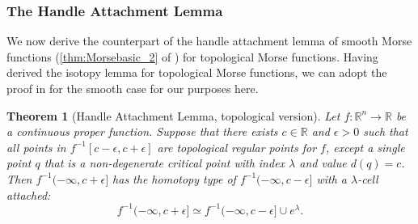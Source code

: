\documentclass[11pt]{article}
\newcommand{\R}{\mathbb{R}}
\newcommand{\eps}{\epsilon}
\newcommand{\union}{\cup}
\theoremstyle{plain}
\newtheorem{thm}{Theorem}
\theoremstyle{definition}
\theoremstyle{remark}
\begin{document}
\subsubsection{The Handle Attachment Lemma}

We now derive the counterpart of the handle attachment lemma of smooth Morse functions (\ref{thm:Morsebasic_2} of ) for topological Morse functions. Having derived the isotopy lemma for topological Morse functions, we can adopt the proof in \cite{milnor_morse_1963} for the smooth case for our purposes here. 

\begin{thm}[Handle Attachment Lemma, topological version]
\label{thm:topological_handle_lemma}
Let $f : \R^n \to \R$ be a continuous proper function.
Suppose that there exists $c \in \R$ and $\eps > 0$ such that 
all points in $f^{-1}[c-\eps,c+\eps]$ are topological regular points for $f$, except a single point $q$ that is a non-degenerate critical point with index $\lambda$ and value $d(q) = c$. 
Then $f^{-1}(-\infty, c + \eps]$ has the homotopy type of $f^{-1}(-\infty, c - \eps]$ with a $\lambda$-cell attached: 
\[f^{-1}(-\infty, c + \eps] \simeq f^{-1}(-\infty, c - \eps] \union e^\lambda.\]
\end{thm}
\end{document}
